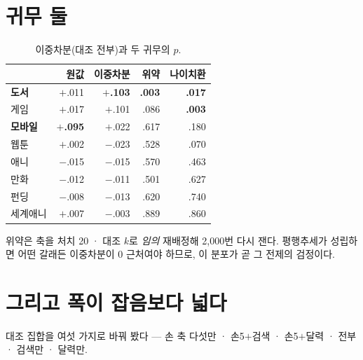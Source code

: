 \documentclass[10pt]{article}
\begin{document}
\section{귀무 둘}

\begin{table}[t]
\centering\tsize
\caption{이중차분(대조 전부)과 두 귀무의 $p$.}
\begin{tabular}{lrrrr}
\toprule
& 원값 & 이중차분 & 위약 & 나이치환 \\
\midrule
\textbf{도서} & $+$.011 & \textbf{$+$.103} & \textbf{.003} & \textbf{.017} \\
게임 & $+$.017 & $+$.101 & .086 & \textbf{.003} \\
\textbf{모바일} & \textbf{$+$.095} & $+$.022 & .617 & .180 \\
웹툰 & $+$.002 & $-$.023 & .528 & .070 \\
애니 & $-$.015 & $-$.015 & .570 & .463 \\
만화 & $-$.012 & $-$.011 & .501 & .627 \\
펀딩 & $-$.008 & $-$.013 & .620 & .740 \\
세계애니 & $+$.007 & $-$.003 & .889 & .860 \\
\bottomrule
\end{tabular}
\end{table}

위약은 축을 처치 20 · 대조 $k$로 \emph{임의} 재배정해 2{,}000번 다시
잰다. 평행추세가 성립하면 어떤 갈래든 이중차분이 0 근처여야 하므로, 이
분포가 곧 그 전제의 검정이다.



\section{그리고 폭이 잡음보다 넓다}

대조 집합을 여섯 가지로 바꿔 봤다 --- 손 축 다섯만 · 손5$+$검색 ·
손5$+$달력 · 전부 · 검색만 · 달력만.
\end{document}
